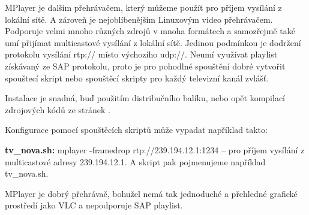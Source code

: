 MPlayer je dalším přehrávačem, který můžeme použít pro příjem vysílání z lokální sítě. A zároveň je nejoblíbenějším Linuxovým video přehrávačem. Podporuje velmi mnoho různých zdrojů v mnoha formátech a samozřejmě také umí přijímat multicastové vysílání z lokální sítě. Jedinou podmínkou je dodržení protokolu vysílání rtp:// místo výchozího udp://. Neumí využívat playlist získávaný ze SAP protokolu, proto je pro pohodlné spouštění dobré vytvořit spouštecí skript nebo spouštěcí skripty pro každý televizní kanál zvlášť.

Instalace je snadná, buď použitím distribučního balíku, nebo opět kompilací zdrojových kódů ze stránek \cite{mplayerURL}. 

Konfigurace pomocí spouštěcích skriptů může vypadat například takto:

\textbf{tv\_nova.sh:} mplayer -framedrop rtp://239.194.12.1:1234 -- pro příjem vysílání z multicastové adresy 239.194.12.1. A skript pak pojmenujeme například tv\_nova.sh.

MPlayer je dobrý přehrávač, bohužel nemá tak jednoduché a přehledné grafické prostředí jako VLC a nepodporuje SAP playlist.
